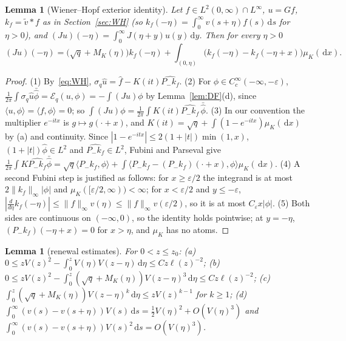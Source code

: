 \documentclass[11pt]{amsart}
\newcommand{\cE}{\mathcal{E}}
\newcommand{\dd}{\,\mathrm{d}}
\newcommand{\eps}{\varepsilon}
\newtheorem{lemma}[theorem]{Lemma}
\theoremstyle{definition}
\theoremstyle{remark}
\numberwithin{equation}{section}
\begin{document}
\begin{lemma}[Wiener--Hopf exterior identity]\label{lem:extid}
Let $f\in L^2(0,\infty)\cap L^\infty$, $u=Gf$, $k_f=\tilde v*f$ as in Section~\ref{sec:WH} (so $k_f(-\eta)=\int_0^\infty v(s+\eta)f(s)\dd s$ for $\eta>0$), and $(Ju)(-\eta)=\int_0^\infty J(\eta+y)u(y)\dd y$. Then for every $\eta>0$
\[
(Ju)(-\eta)=\bigl(\sqrt q+M_K(\eta)\bigr)k_f(-\eta)+\int_{(0,\eta)}\bigl(k_f(-\eta)-k_f(-\eta+x)\bigr)\mu_K(\dd x).
\]
\end{lemma}

\begin{proof}
(1) By~\eqref{eq:WH}, $\sigma_q\hat u=\hat f-K(it)\widehat{P_-k_f}$. (2) For $\phi\in C_c^\infty(-\infty,-\eps)$, $\frac1{2\pi}\int\sigma_q\hat u\bar{\hat\phi}=\cE_q(u,\phi)=-\int(Ju)\phi$ by Lemma~\ref{lem:DF}(d), since $\langle u,\phi\rangle=\langle f,\phi\rangle=0$; so $\int(Ju)\phi=\frac1{2\pi}\int K(it)\widehat{P_-k_f}\,\bar{\hat\phi}$. (3) In our convention the multiplier $e^{-itx}$ is $g\mapsto g(\cdot+x)$, and $K(it)=\sqrt q+\int(1-e^{-itx})\mu_K(\dd x)$ by (a) and continuity. Since $|1-e^{-itx}|\le2(1+|t|)\min(1,x)$, $(1+|t|)\hat\phi\in L^2$ and $\widehat{P_-k_f}\in L^2$, Fubini and Parseval give $\frac1{2\pi}\int K\widehat{P_-k_f}\bar{\hat\phi}=\sqrt q\langle P_-k_f,\phi\rangle+\int\langle P_-k_f-(P_-k_f)(\cdot+x),\phi\rangle\mu_K(\dd x)$. (4) A second Fubini step is justified as follows: for $x\ge\eps/2$ the integrand is at most $2\|k_f\|_\infty|\phi|$ and $\mu_K([\eps/2,\infty))<\infty$; for $x<\eps/2$ and $y\le-\eps$, $|\frac d{d\eta}k_f(-\eta)|\le\|f\|_\infty v(\eta)\le\|f\|_\infty v(\eps/2)$, so it is at most $C_\eps x|\phi|$. (5) Both sides are continuous on $(-\infty,0)$, so the identity holds pointwise; at $y=-\eta$, $(P_-k_f)(-\eta+x)=0$ for $x>\eta$, and $\mu_K$ has no atoms.
\end{proof}

\begin{lemma}[renewal estimates]\label{lem:renest}
For $0<z\le z_0$: (a) $0\le zV(z)^2-\int_0^zV(\eta)V(z-\eta)\dd\eta\le Cz\ell(z)^{-2}$; (b) $0\le zV(z)^2-\int_0^z(\sqrt q+M_K(\eta))V(z-\eta)^3\dd\eta\le Cz\ell(z)^{-2}$; (c) $\int_0^z(\sqrt q+M_K(\eta))V(z-\eta)^k\dd\eta\le zV(z)^{k-1}$ for $k\ge1$; (d) $\int_0^\infty(v(s)-v(s+\eta))V(s)\dd s=\frac12V(\eta)^2+O(V(\eta)^3)$ and $\int_0^\infty(v(s)-v(s+\eta))V(s)^2\dd s=O(V(\eta)^3)$.
\end{lemma}
\end{document}
